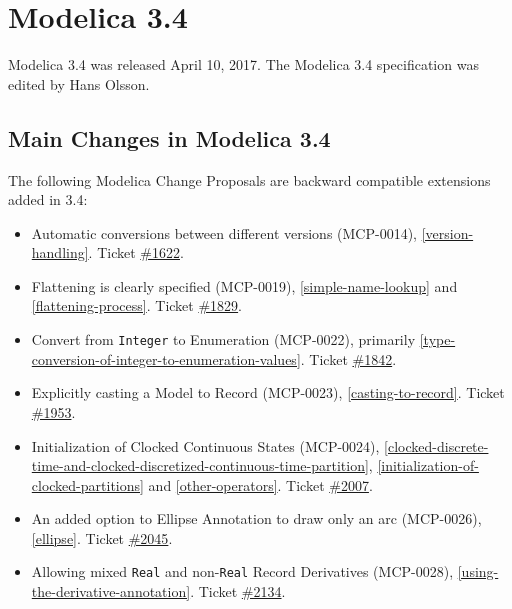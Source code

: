 \section{Modelica 3.4}\label{modelica-3-4}

Modelica 3.4 was released April 10, 2017. The Modelica 3.4 specification
was edited by Hans Olsson.

\subsection{Main Changes in Modelica 3.4}\label{main-changes-in-modelica-3-4}

The following Modelica Change Proposals are backward compatible
extensions added in 3.4:
\begin{itemize}
\item
  Automatic conversions between different versions (MCP-0014),
  \cref{version-handling}. Ticket
  \href{https://github.com/modelica/ModelicaSpecification/issues/1622}{\#1622}.
\item
  Flattening is clearly specified (MCP-0019), \cref{simple-name-lookup} and \cref{flattening-process}.
  Ticket \href{https://github.com/modelica/ModelicaSpecification/issues/1829}{\#1829}.
\item
  Convert from \lstinline!Integer! to Enumeration (MCP-0022), primarily \cref{type-conversion-of-integer-to-enumeration-values}.
  Ticket \href{https://github.com/modelica/ModelicaSpecification/issues/1842}{\#1842}.
\item
  Explicitly casting a Model to Record (MCP-0023), \cref{casting-to-record}.
  Ticket \href{https://github.com/modelica/ModelicaSpecification/issues/1953}{\#1953}.
\item
  Initialization of Clocked Continuous States (MCP-0024),
  \cref{clocked-discrete-time-and-clocked-discretized-continuous-time-partition},
  \cref{initialization-of-clocked-partitions} and \cref{other-operators}. Ticket
  \href{https://github.com/modelica/ModelicaSpecification/issues/2007}{\#2007}.
\item
  An added option to Ellipse Annotation to draw only an arc (MCP-0026),
  \cref{ellipse}. Ticket
  \href{https://github.com/modelica/ModelicaSpecification/issues/2045}{\#2045}.
\item
  Allowing mixed \lstinline!Real! and non-\lstinline!Real! Record Derivatives (MCP-0028), \cref{using-the-derivative-annotation}.
  Ticket \href{https://github.com/modelica/ModelicaSpecification/issues/2134}{\#2134}.
\end{itemize}

